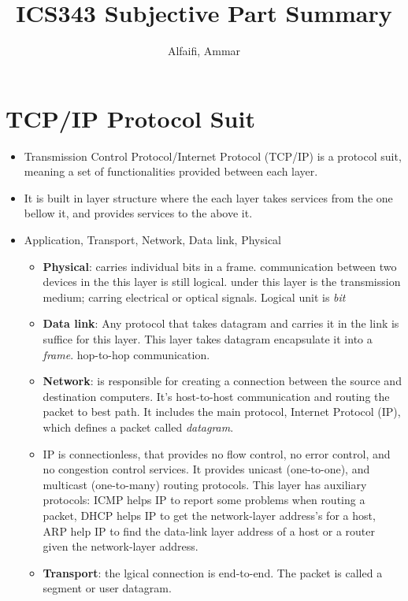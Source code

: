 \documentclass{article}
\title{ICS343 Subjective Part Summary}
\author{Alfaifi, Ammar}
\date{}
\begin{document}
\maketitle


\section{TCP/IP Protocol Suit}%
\label{sec:TCP}
\begin{itemize}

  \item Transmission Control Protocol/Internet Protocol (TCP/IP) is a protocol suit, meaning a set of functionalities
        provided between each layer.
  \item It is built in layer structure where the each layer takes services from the one bellow it,
        and provides services to the above it.
  \item Application, Transport, Network, Data link, Physical
        \begin{itemize}
          \item \textbf{Physical}: carries individual bits in a frame. communication between two devices
                in the this layer is still logical. under this layer is the transmission medium; carring
                electrical or optical signals. Logical unit is \textit{bit}
          \item \textbf{Data link}: Any protocol that takes datagram and carries it in the link is suffice
                for this layer. This layer takes datagram encapsulate it into a \textit{frame}. hop-to-hop communication.
          \item \textbf{Network}: is responsible for creating a connection between the source and destination computers. It's
                host-to-host communication and routing the packet to best path. It includes the main protocol, Internet Protocol (IP),
                which defines a packet called \textit{datagram}.
          \item IP is connectionless, that provides no flow control, no error control, and no congestion control services.
                It provides unicast  (one-to-one), and multicast (one-to-many) routing protocols.
                This layer has auxiliary protocols: ICMP helps IP to report some problems when routing a packet,
                DHCP helps IP to get the network-layer address's for a host, ARP help IP to find the data-link layer address
                of a host or a router given the network-layer address.
          \item \textbf{Transport}: the lgical connection is end-to-end. The packet is called a segment or user datagram.

\end{itemize}
\end{itemize}
\end{document}
